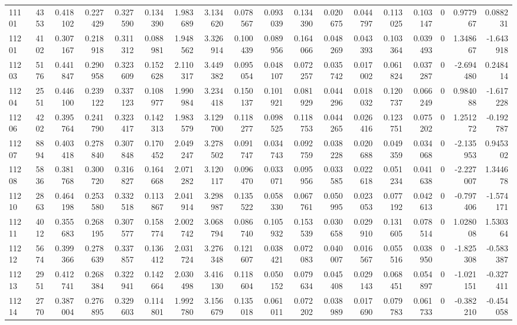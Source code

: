 \begin{tabular}{lrrrrrrrrrrrrrrrrr}
11101 & 4353 & 0.418102 & 0.227429 & 0.327590 & 0.134390 & 1.983689 & 3.134620 & 0.078567 & 0.093039 & 0.134390 & 0.020675 & 0.044797 & 0.113025 & 0.103147 & 0 & 0.977967 & 0.088231 \\
11201 & 4102 & 0.307167 & 0.218918 & 0.311312 & 0.088981 & 1.948562 & 3.326914 & 0.100439 & 0.089956 & 0.164066 & 0.048269 & 0.043393 & 0.103364 & 0.039493 & 0 & 1.348667 & -1.643918 \\
11203 & 5176 & 0.441847 & 0.290958 & 0.323609 & 0.152628 & 2.110317 & 3.449382 & 0.095054 & 0.048107 & 0.072257 & 0.035742 & 0.017002 & 0.061824 & 0.037287 & 0 & -2.694480 & 0.248414 \\
11204 & 2551 & 0.446100 & 0.239122 & 0.337123 & 0.108977 & 1.990984 & 3.234418 & 0.150137 & 0.101921 & 0.081929 & 0.044296 & 0.018032 & 0.120737 & 0.066249 & 0 & 0.984088 & -1.617228 \\
11206 & 4202 & 0.395764 & 0.241790 & 0.323417 & 0.142313 & 1.983579 & 3.129700 & 0.118277 & 0.098525 & 0.118753 & 0.044265 & 0.026416 & 0.123751 & 0.075202 & 0 & 1.251272 & -0.192787 \\
11207 & 8894 & 0.403418 & 0.278840 & 0.307848 & 0.170452 & 2.049247 & 3.278502 & 0.091747 & 0.034743 & 0.092759 & 0.038228 & 0.020688 & 0.049359 & 0.034068 & 0 & -2.135953 & 0.945302 \\
11208 & 5836 & 0.381768 & 0.300720 & 0.316827 & 0.164668 & 2.071282 & 3.120117 & 0.096470 & 0.033071 & 0.095956 & 0.033585 & 0.022618 & 0.051234 & 0.041638 & 0 & -2.227007 & 1.344678 \\
11210 & 2863 & 0.464198 & 0.253580 & 0.332518 & 0.113867 & 2.041914 & 3.298987 & 0.135522 & 0.058330 & 0.067761 & 0.050995 & 0.023053 & 0.077192 & 0.042613 & 0 & -0.797406 & -1.574171 \\
11211 & 4012 & 0.355683 & 0.268195 & 0.307577 & 0.158774 & 2.002742 & 3.068794 & 0.086740 & 0.105932 & 0.153539 & 0.030658 & 0.029910 & 0.131605 & 0.078514 & 0 & 1.028008 & 1.530364 \\
11212 & 5674 & 0.399366 & 0.278639 & 0.337857 & 0.136412 & 2.031724 & 3.276348 & 0.121607 & 0.038421 & 0.072083 & 0.040007 & 0.016567 & 0.055516 & 0.038950 & 0 & -1.825308 & -0.583387 \\
11213 & 2951 & 0.412741 & 0.268384 & 0.322941 & 0.142664 & 2.030498 & 3.416130 & 0.118604 & 0.050152 & 0.079634 & 0.045408 & 0.029143 & 0.068451 & 0.054897 & 0 & -1.021151 & -0.327411 \\
11214 & 2770 & 0.387004 & 0.276895 & 0.329603 & 0.114801 & 1.992780 & 3.156679 & 0.135018 & 0.061011 & 0.072202 & 0.038989 & 0.017690 & 0.079783 & 0.061733 & 0 & -0.382210 & -0.454058 \\

\end{tabular}
